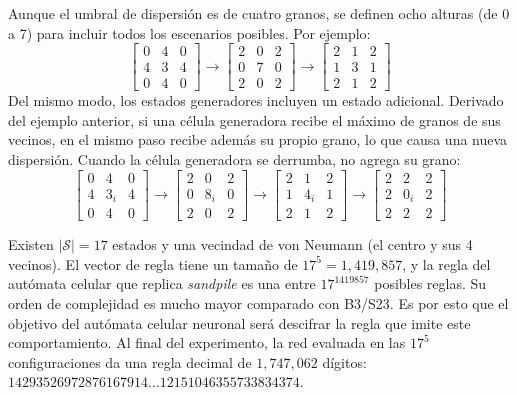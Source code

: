 Aunque el umbral de dispersión es de cuatro granos, se definen ocho alturas (de 0 a 7) para incluir todos los escenarios posibles. Por ejemplo: 
\[
\left[\begin{matrix}
	0 & 4 & 0 \\
	4 & 3 & 4 \\
	0 & 4 & 0
\end{matrix}\right] \rightarrow
\left[\begin{matrix}
	2 & 0 & 2 \\
	0 & 7 & 0 \\
	2 & 0 & 2
\end{matrix}\right] \rightarrow
\left[\begin{matrix}
	2 & 1 & 2 \\
	1 & 3 & 1 \\
	2 & 1 & 2
\end{matrix}\right]
\]
Del mismo modo, los estados generadores incluyen un estado adicional. Derivado del ejemplo anterior, si una célula generadora recibe el máximo de granos de sus vecinos, en el mismo paso recibe además su propio grano, lo que causa una nueva dispersión. Cuando la célula generadora se derrumba, no agrega su grano:
\[
\left[\begin{matrix}
	0 & 4 & 0 \\
	4 & 3_i & 4 \\
	0 & 4 & 0
\end{matrix}\right] \rightarrow
\left[\begin{matrix}
	2 & 0 & 2 \\
	0 & 8_i & 0 \\
	2 & 0 & 2
\end{matrix}\right] \rightarrow
\left[\begin{matrix}
	2 & 1 & 2 \\
	1 & 4_i & 1 \\
	2 & 1 & 2
\end{matrix}\right] \rightarrow
\left[\begin{matrix}
	2 & 2 & 2 \\
	2 & 0_i & 2 \\
	2 & 2 & 2
\end{matrix}\right]
\]

Existen $|\mathcal{S}| = 17$ estados y una vecindad de von Neumann (el centro y sus 4 vecinos). El vector de regla tiene un tamaño de $17^5 = 1{,}419{,}857$, y la regla del autómata celular que replica \textit{sandpile} es una entre $17^{1419857}$ posibles reglas. Su orden de complejidad es mucho mayor comparado con B3/S23. Es por esto que el objetivo del autómata celular neuronal será descifrar la regla que imite este comportamiento. Al final del experimento, la red evaluada en las $17^5$ configuraciones da una regla decimal de $1{,}747{,}062$ dígitos: $14293526972876167914\ldots12151046355733834374$.

